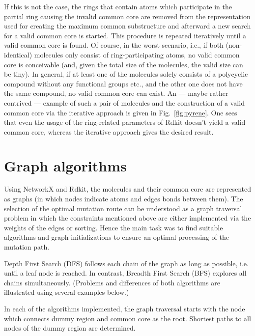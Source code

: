 If this is not the case, the rings that contain atoms which participate in the partial ring causing the invalid common core are removed from the representation used for creating the maximum common substructure and afterward a new search for a valid common core is started. This procedure is repeated iteratively until a valid common core is found.
Of course, in the worst scenario, i.e., if both (non-identical) molecules only consist of ring-participating atoms, no valid common core is conceivable (and, given the total size of the molecules, the valid size can be tiny). In general, if at least one of the molecules solely consists of a polycyclic compound without any functional groups etc., and the other one does not have the same compound, no valid common core can exist. 
An --- maybe rather contrived --- example of such a pair of molecules and the construction of a valid common core via the iterative approach is given in Fig.~\ref{fig:pyrene}. One sees that even the usage of the ring-related parameters of Rdkit doesn't yield a valid common core, whereas the iterative approach gives the desired result.



\section{Graph algorithms}

Using NetworkX and Rdkit, the molecules and their common core are
represented as graphs (in which nodes indicate atoms and edges bonds
between them). The selection of the optimal mutation route can be
understood as a graph traversal problem in which the constraints mentioned
above are either implemented via the weights of the edges or sorting.
Hence the main task was to find suitable algorithms and graph initializations
to ensure an optimal processing of the mutation path.

Depth First Search (DFS) follows each chain of the graph as long as
possible, i.e. until a leaf node is reached. In contrast, Breadth
First Search (BFS) explores all chains simultaneously.\cite{Even.2012}
(Problems and differences of both algorithms are illustrated using
several examples below.)

In each of the algorithms implemented, the graph traversal starts
with the node which connects dummy region and common core as the root.
Shortest paths to all nodes of the dummy region are determined.

